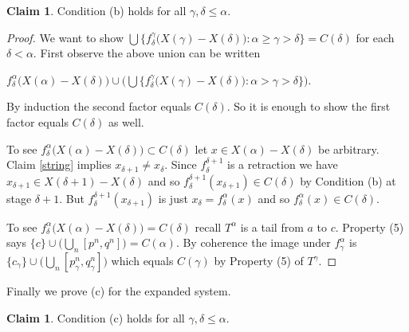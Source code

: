 \documentclass[12pt]{article}
\theoremstyle{plain}
\theoremstyle{definition}
\newcounter{ClaimCounter}
\newtheorem{claim}[ClaimCounter]{Claim}
\newcounter{claim5counter}
\newcommand{\A}{\ensuremath{\alpha}}
\newcommand{\G}{\ensuremath{\gamma}}
\newcommand{\D}{\ensuremath{\delta}}
\newcommand{\0}{\ensuremath{\varnothing}}
\begin{document}
	\begin{claim}\label{data(i)}
		Condition (b) holds for all $\G,\D \le \A$.
	\end{claim}
	
	\begin{proof}	
		
		We want to show $\bigcup  \big \{f^\G_\D \big (X(\G) - X(\D) \big ): \A \ge \G > \D \big \} = C(\D)$ for each $\D< \A$. First observe the above union can be written
		
		\begin{center}
			$f^\A_\D \big ( X(\A)-X(\D)\big ) \cup \Big (  \bigcup  \big \{f^\G_\D \big (X(\G) - X(\D) \big ): \A > \G > \D \big \} \Big )$.
		\end{center}
		
		By induction the second factor equals $C(\D)$. So it is enough to show the first factor equals $C(\D)$ as well. 
		
		To see $f^\A_\D \big ( X(\A)-X(\D) \big ) \subset C(\D)$ let $x \in X(\A)-X(\D)$ be arbitrary. Claim \ref{string} implies $x_{\D+1} \ne x_{\D}$. Since $f^{\D+1}_\D$ is a retraction we have $x_{\D+1} \in  X(\D+1)-X(\D)$ and so $f^{\D+1}_\D(x_{\D+1}) \in C(\D)$ by Condition (b) at stage $\D+1$. But  $f^{\D+1}_\D(x_{\D+1})$ is just $x_\D = f^\A_\D(x)$ and so $f^\A_\D(x) \in C(\D)$.
		
		To see $f^\A_\D \big ( X(\A)-X(\D) \big ) = C(\D)$ recall $T^\A$ is a tail from $a$ to $c$. Property (5) says $\{c\} \cup \Big ( \bigcup_n [p^n,q^n] \Big ) = C(\A)$. By coherence the image under $f^\A_\G$ is \mbox{$\{c_\G\} \cup \Big ( \bigcup_n [p^n_\G,q^n_\G] \Big ) $} which equals $C(\G)$ by Property (5) of $T^\G$.
	\end{proof}
	
	Finally we prove (c) for the expanded system.
	
	
	\begin{claim}\label{Prop(c)}
		Condition (c) holds for all $\G,\D \le \A$.
	\end{claim}
	
\end{document}
